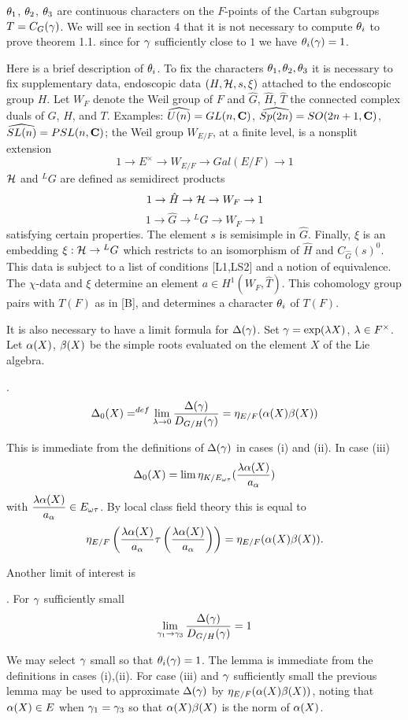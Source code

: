 ${\theta}_1$, ${\theta}_2$, ${\theta}_3$ are continuous characters on the $F$-points
of the Cartan subgroups $T=C_G({\gamma})$.  We will see in section 4 that
it is not necessary to compute ${\theta}_i$ to prove theorem 1.1.  since
for ${\gamma}$ sufficiently close to $1$ we have
${\theta}_i({\gamma})=1$.  

Here is a brief description of ${\theta}_i$.  
To fix the characters ${\theta}_1,{\theta}_2,{\theta}_3$ it is 
necessary to fix supplementary data, endoscopic data $(H,{\cal H},s,\xi)$
attached to the endoscopic group $H$.  Let $W_F$ denote the
Weil group of $F$ and $\hat G$, $\hat H$, $\hat T$ the connected
complex duals of $G$, $H$, and $T$.  Examples: $\widehat {U(n)} = GL(n,{\bf{C}})$, 
$\widehat{Sp(2n) } = SO(2n+1,{\bf{C}})$, $\widehat{SL(n)} = PSL(n,{\bf{C}})$;
the Weil group $W_{E/F}$, at a finite level, is a nonsplit extension
$$1 \to E^\times \to W_{E/F} \to Gal(E/F) \to 1$$
${\cal H}$ and ${}^LG$ are defined as semidirect products
$$1 \to \hat H \to {\cal H} \to W_F \to 1$$
$$1 \to \hat G \to {}^LG \to W_F \to 1$$
satisfying certain properties.  The element $s$ is semisimple in $\hat G$.
Finally, $\xi$ is an embedding $\xi: {\cal H} \to {}^LG$ which
restricts to an isomorphism of $\hat H$ and $C_{\hat G}(s)^0$.   This 
data is subject to a list of conditions [L1,LS2] and a notion of
equivalence.  The $\chi$-data and $\xi$ determine an element
$a\in H^1(W_F,\hat T)$.  This cohomology group pairs with $T(F)$ as
in [B], and determines a character ${\theta}_i$ of $T(F)$.


It is also necessary to have a limit formula for $\Delta({\gamma})$.
Set ${\gamma} = \exp({\lambda} X)$, ${\lambda} \in F^\times$.  Let ${\alpha}(X)$, ${\beta}(X)$
be the simple roots evaluated on the element $X$ of the Lie algebra.

.  $$\Delta_0(X) =^{def} \lim_{{\lambda}\to 0} {\Delta({\gamma})
\over D_{G/H}({\gamma})} = {\eta_{E/F}}({\alpha}(X){\beta}(X))$$

\proof   This is immediate from the definitions of $\Delta({\gamma})$ in 
cases (i) and (ii).  In case (iii) 
$$\Delta_0(X) = \lim \eta_{K/E_{\omega\tau}}
(\displaystyle {{\lambda}{\alpha}(X)\over a_{\alpha}})$$ with $\displaystyle {{\lambda}{\alpha}(X)
\over a_{\alpha}}\in E_{\omega\tau}$.  By local class field theory this is
equal to $${\eta_{E/F}}\left(\displaystyle { {{\lambda}{\alpha}(X) \over a_{\alpha}} \tau \left(
{{\lambda}{\alpha}(X) \over a_{\alpha}}\right)}\right) = {\eta_{E/F}}({\alpha}(X){\beta}(X)).$$

\smallskip
Another limit of interest is

.  For ${\gamma}$ sufficiently small $$\lim_{{\gamma}_1\to{\gamma}_3}
{\Delta({\gamma})\over D_{G/H}({\gamma})} =1$$

\proof  We may select ${\gamma}$ small so that ${\theta}_i({\gamma})=1$.  
The lemma is immediate from the definitions in cases (i),(ii).
For case (iii) and ${\gamma}$ sufficiently small the previous lemma
may be used to approximate $\Delta({\gamma})$ by ${\eta_{E/F}}({\alpha}(X){\beta}(X))$, 
noting that ${\alpha}(X)\in E$ when ${\gamma}_1={\gamma}_3$ so that ${\alpha}(X){\beta}(X)$ is
the norm of ${\alpha}(X)$.

